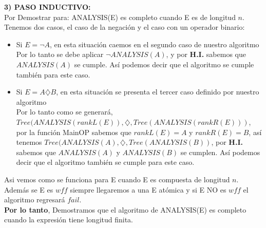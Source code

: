 \textbf{3) PASO INDUCTIVO:}\\
\newline
Por Demostrar para: ANALYSIS(E) es completo cuando E es de longitud $n$. \\
Tenemos dos casos, el caso de la negación y el caso con un operador binario:\\
\begin{itemize}
    \item Si $E=\neg A$, en esta situación caemos en el segundo caso de nuestro algoritmo\\
    Por lo tanto se debe aplicar $\neg ANALYSIS(A)$, y por \textbf{H.I.} sabemos que $ANALYSIS(A)$ se cumple. Así podemos decir que el algoritmo se cumple también para este caso.
    \item Si $E = A \diamondsuit B$, en esta situación se presenta el tercer caso definido por nuestro algoritmo\\
    Por lo tanto como se generará, \\ $Tree(ANALYSIS(rankL(E)),\diamondsuit,Tree(ANALYSIS(rankR(E)))$, por la función MainOP sabemos que $rankL(E)=A$ y $rankR(E)=B$, así tenemos $Tree(ANALYSIS(A),\diamondsuit,Tree(ANALYSIS(B))$, por \textbf{H.I.} sabemos que $ANALYSIS(A)$ y $ANALYSIS(B)$ se cumplen. Así podemos decir que el algoritmo también se cumple para este caso.
\end{itemize}
Asi vemos como se funciona para E cuando E es compuesta de longitud $n$. \\
\newline 
Además se E es $wff$ siempre llegaremos a una E atómica y si E NO es $wff$ el algoritmo regresará $fail$. \\
\newline
\textbf{Por lo tanto}, Demostramos que el algoritmo de ANALYSIS(E) es completo cuando la expresión tiene longitud finita.